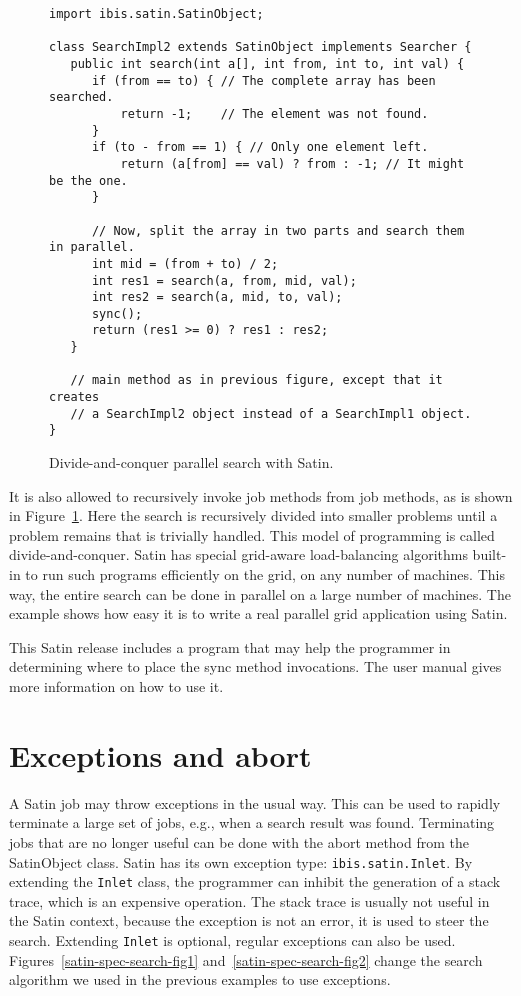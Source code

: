 \documentclass[10pt]{article}
\begin{document}
\begin{figure}[t!]
{\small
\begin{verbatim}
import ibis.satin.SatinObject;

class SearchImpl2 extends SatinObject implements Searcher {
   public int search(int a[], int from, int to, int val) {
      if (from == to) { // The complete array has been searched.
          return -1;    // The element was not found.
      }
      if (to - from == 1) { // Only one element left.
          return (a[from] == val) ? from : -1; // It might be the one.
      }

      // Now, split the array in two parts and search them in parallel.
      int mid = (from + to) / 2;
      int res1 = search(a, from, mid, val);
      int res2 = search(a, mid, to, val);
      sync();
      return (res1 >= 0) ? res1 : res2;
   }

   // main method as in previous figure, except that it creates
   // a SearchImpl2 object instead of a SearchImpl1 object.
}
\end{verbatim}
}
\caption{Divide-and-conquer parallel search with Satin.}
\label{satin-par-search-fig}
\end{figure}

It is also allowed to recursively invoke job methods from job methods,
as is shown in Figure~\ref{satin-par-search-fig}. Here the search is recursively divided into
smaller problems until a problem remains that is trivially
handled. This model of programming is called divide-and-conquer. Satin
has special grid-aware load-balancing algorithms built-in to run such
programs efficiently on the grid, on any number of machines. This way,
the entire search can be done in parallel on a large number of
machines. The example shows how easy it is to write a real parallel
grid application using Satin.  

This Satin release includes a program that may help the programmer in determining
where to place the sync method invocations. The user manual gives more information
on how to use it.

\section{Exceptions and abort}

A Satin job may
throw exceptions in the usual way. This can be used to rapidly
terminate a large set of jobs, e.g., when a search result was
found. Terminating jobs that are no longer useful can be done with the
abort method from the SatinObject class.  Satin has its own exception
type: \texttt{ibis.satin.Inlet}.  By extending the \texttt{Inlet} class,
the programmer can inhibit the generation of a stack trace,
which is an expensive operation.
The stack trace is usually not useful in the Satin context,
because the exception is not an error, it is used to steer the
search. Extending \texttt{Inlet} is optional, regular exceptions can also be
used. Figures~\ref{satin-spec-search-fig1} and~\ref{satin-spec-search-fig2} change the search algorithm we used in the previous
examples to use exceptions.
\end{document}
